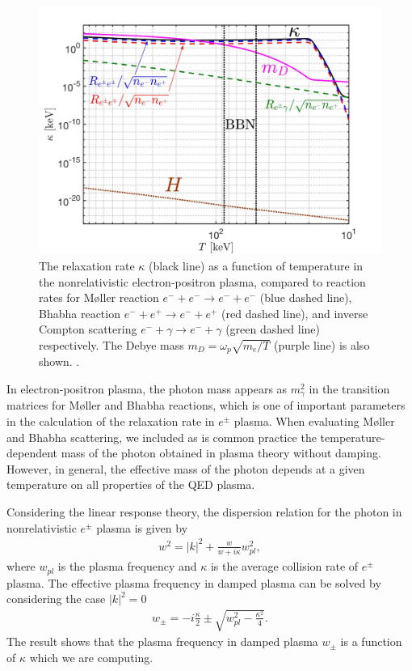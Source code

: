 \begin{figure} 
\centerline{\includegraphics[width=0.9\linewidth]{./plots/May152023Kappa_EPPlasma}}
\caption{The relaxation rate $\kappa$ (black line) as a function of temperature in the nonrelativistic electron-positron plasma, compared to reaction rates  for M{\o}ller reaction $e^-+e^-\to e^-+e^-$ (blue dashed line), Bhabha reaction $e^-+e^+\to e^-+e^+$ (red dashed line), and inverse Compton scattering $e^-+\gamma\to e^-+\gamma$ (green dashed line) respectively. The Debye mass $m_D=\omega_{p}\sqrt{m_e/T}$ (purple line) is also shown. . }
\label{RelaxationRate:fig}
\end{figure}


In electron-positron plasma, the photon mass appears as $m_\gamma^2$ in the transition matrices for M{\o}ller and Bhabha reactions, which is one of important parameters in the calculation of the relaxation rate in $e^\pm$ plasma. When evaluating M{\o}ller and Bhabha scattering, we included as is common practice the temperature-dependent mass of the photon obtained in plasma theory without damping. However, in general, the effective mass of the photon depends at a given temperature on all properties of the QED plasma. 

Considering the linear response theory, the dispersion relation for the photon in nonrelativistic $e^\pm$ plasma is given by~\cite{Formanek:2021blc}
\begin{align}\label{dispersion_damping}
w^2=|k|^2+\frac{w}{w+i\kappa}w_{pl}^2,
\end{align}
where $w_{pl}$ is the plasma frequency and $\kappa$ is the average collision rate of $e^\pm$ plasma. The effective plasma frequency in damped plasma can be solved by considering the case $|k|^2=0$~\cite{Formanek:2021blc}
\begin{align}\label{plasmafrequency_damped}
w_{\pm}=-i\frac{\kappa}{2}\pm\sqrt{w^2_{pl}-\frac{\kappa^2}{4}}.
\end{align}
The result shows that the plasma frequency in damped plasma $w_\pm$ is a function of $\kappa$ which we are computing.  

